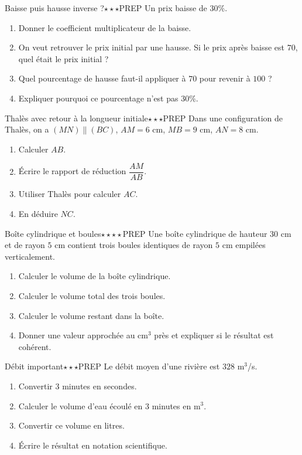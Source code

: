 \documentclass[11pt,a4paper]{article}
\newcounter{exo}
\begin{document}
\begin{exobox}{Baisse puis hausse inverse ?}{$\star\star\star$}{PREP}
Un prix baisse de $30\%$.
\begin{enumerate}
\item Donner le coefficient multiplicateur de la baisse.
\item On veut retrouver le prix initial par une hausse. Si le prix après baisse est $70$, quel était le prix initial ?
\item Quel pourcentage de hausse faut-il appliquer à $70$ pour revenir à $100$ ?
\item Expliquer pourquoi ce pourcentage n'est pas $30\%$.
\end{enumerate}
\end{exobox}

\begin{exobox}{Thalès avec retour à la longueur initiale}{$\star\star\star$}{PREP}
Dans une configuration de Thalès, on a $(MN)\parallel(BC)$, $AM=6$ cm, $MB=9$ cm, $AN=8$ cm.
\begin{enumerate}
\item Calculer $AB$.
\item Écrire le rapport de réduction $\dfrac{AM}{AB}$.
\item Utiliser Thalès pour calculer $AC$.
\item En déduire $NC$.
\end{enumerate}
\end{exobox}

\begin{exobox}{Boîte cylindrique et boules}{$\star\star\star\star$}{PREP}
Une boîte cylindrique de hauteur $30$ cm et de rayon $5$ cm contient trois boules identiques de rayon $5$ cm empilées verticalement.
\begin{enumerate}
\item Calculer le volume de la boîte cylindrique.
\item Calculer le volume total des trois boules.
\item Calculer le volume restant dans la boîte.
\item Donner une valeur approchée au cm$^3$ près et expliquer si le résultat est cohérent.
\end{enumerate}
\end{exobox}

\begin{exobox}{Débit important}{$\star\star\star$}{PREP}
Le débit moyen d'une rivière est $328$ m$^3$/s.
\begin{enumerate}
\item Convertir $3$ minutes en secondes.
\item Calculer le volume d'eau écoulé en $3$ minutes en m$^3$.
\item Convertir ce volume en litres.
\item Écrire le résultat en notation scientifique.
\end{enumerate}
\end{exobox}
\end{document}
